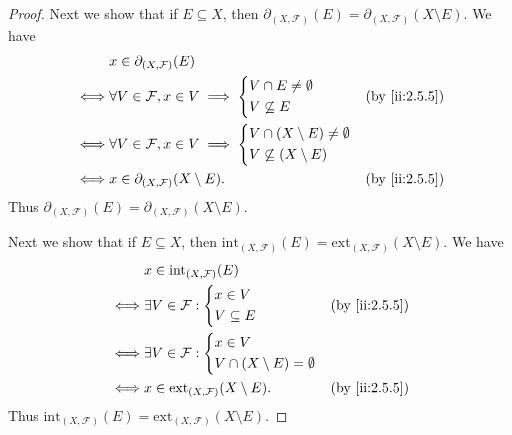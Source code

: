 \begin{proof}
  Next we show that if \(E \subseteq X\), then \(\partial_{(X, \mathcal{F})}(E) = \partial_{(X, \mathcal{F})}(X \setminus E)\).
  We have
  \begin{align*}
         & x \in \partial_{(X, \mathcal{F})}(E)                                              \\
    \iff & \forall V \in \mathcal{F}, x \in V \implies \begin{dcases}
                                                         V \cap E \neq \emptyset \\
                                                         V \not\subseteq E
                                                       \end{dcases} &  & \by{ii:2.5.5}       \\
    \iff & \forall V \in \mathcal{F}, x \in V \implies \begin{dcases}
                                                         V \cap (X \setminus E) \neq \emptyset \\
                                                         V \not\subseteq (X \setminus E)
                                                       \end{dcases} \\
    \iff & x \in \partial_{(X, \mathcal{F})}(X \setminus E).          &  & \by{ii:2.5.5}
  \end{align*}
  Thus \(\partial_{(X, \mathcal{F})}(E) = \partial_{(X, \mathcal{F})}(X \setminus E)\).

  Next we show that if \(E \subseteq X\), then \(\text{int}_{(X, \mathcal{F})}(E) = \text{ext}_{(X, \mathcal{F})}(X \setminus E)\).
  We have
  \begin{align*}
         & x \in \text{int}_{(X, \mathcal{F})}(E)                                 \\
    \iff & \exists V \in \mathcal{F} : \begin{dcases}
                                         x \in V \\
                                         V \subseteq E
                                       \end{dcases}          &  & \by{ii:2.5.5}   \\
    \iff & \exists V \in \mathcal{F} : \begin{dcases}
                                         x \in V \\
                                         V \cap (X \setminus E) = \emptyset
                                       \end{dcases}          \\
    \iff & x \in \text{ext}_{(X, \mathcal{F})}(X \setminus E). &  & \by{ii:2.5.5}
  \end{align*}
  Thus \(\text{int}_{(X, \mathcal{F})}(E) = \text{ext}_{(X, \mathcal{F})}(X \setminus E)\).


\end{proof}
